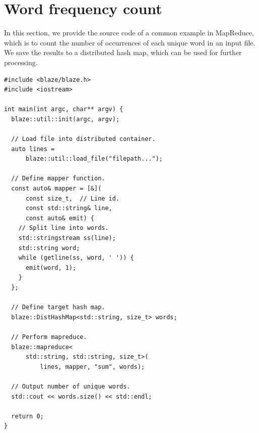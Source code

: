 \documentclass{sigkddExp}
\begin{document}

%

%
%
\appendix
\section{Word frequency count}
In this section, we provide the source code of a common example in MapReduce, which is to count the number of occurrences of each unique word in an input file.
We save the results to a distributed hash map, which can be used for further processing.

\begin{lstlisting}
#include <blaze/blaze.h>
#include <iostream>

int main(int argc, char** argv) {
  blaze::util::init(argc, argv);
  
  // Load file into distributed container.
  auto lines =
      blaze::util::load_file("filepath...");

  // Define mapper function.
  const auto& mapper = [&](
      const size_t,  // Line id.
      const std::string& line,
      const auto& emit) {
    // Split line into words.
    std::stringstream ss(line);
    std::string word;
    while (getline(ss, word, ' ')) {
      emit(word, 1);
    }
  };

  // Define target hash map.
  blaze::DistHashMap<std::string, size_t> words;

  // Perform mapreduce.
  blaze::mapreduce<
      std::string, std::string, size_t>(
          lines, mapper, "sum", words);
    
  // Output number of unique words.
  std::cout << words.size() << std::endl;
  
  return 0;
}
\end{lstlisting}
\end{document}
